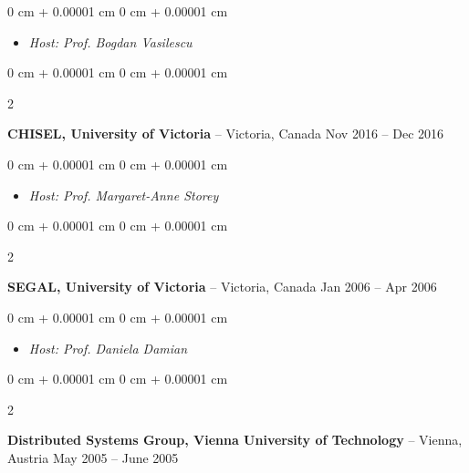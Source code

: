 \documentclass[10pt, a4paper]{article}
\newenvironment{highlights}{
    \begin{itemize}[
        topsep=0.10 cm,
        parsep=0.10 cm,
        partopsep=0pt,
        itemsep=0pt,
        leftmargin=0 cm + 10pt
    ]
}{
    \end{itemize}
} %
\newenvironment{onecolentry}{
    \begin{adjustwidth}{
        0 cm + 0.00001 cm
    }{
        0 cm + 0.00001 cm
    }
}{
    \end{adjustwidth}
} %
\newenvironment{twocolentry}[2][]{
    \onecolentry
    \def\secondColumn{#2}
    \setcolumnwidth{\fill, 4.5 cm}
    \begin{paracol}{2}
}{
    \switchcolumn \raggedleft \secondColumn
    \end{paracol}
    \endonecolentry
} %
\begin{document}
        \vspace{0.10 cm}
        \begin{onecolentry}
            \begin{highlights}
                \item \textit{Host: Prof. Bogdan Vasilescu}
            \end{highlights}
        \end{onecolentry}


        \vspace{0.2 cm}

        \begin{twocolentry}{
            Nov 2016 – Dec 2016
        }
            \textbf{CHISEL, University of Victoria} -- Victoria, Canada\end{twocolentry}

        \vspace{0.10 cm}
        \begin{onecolentry}
            \begin{highlights}
                \item \textit{Host: Prof. Margaret-Anne Storey}
            \end{highlights}
        \end{onecolentry}


        \vspace{0.2 cm}

        \begin{twocolentry}{
            Jan 2006 – Apr 2006
        }
            \textbf{SEGAL, University of Victoria} -- Victoria, Canada\end{twocolentry}

        \vspace{0.10 cm}
        \begin{onecolentry}
            \begin{highlights}
                \item \textit{Host: Prof. Daniela Damian}
            \end{highlights}
        \end{onecolentry}


        \vspace{0.2 cm}

        \begin{twocolentry}{
            May 2005 – June 2005
        }
            \textbf{Distributed Systems Group, Vienna University of Technology} -- Vienna, Austria\end{twocolentry}
\end{document}
